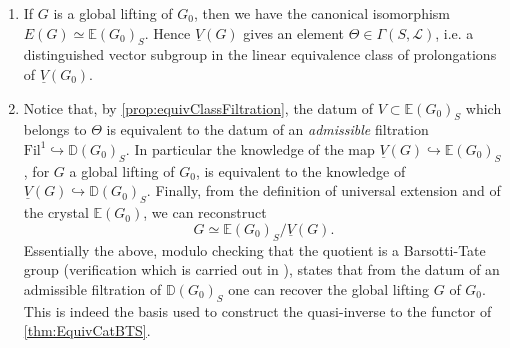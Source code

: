 \begin{rem}[]
\begin{enumerate}
	\item If $G$ is a global lifting of $G_0$, then we have the canonical isomorphism
		$E(G) \simeq \mathbb{E}(G_0)_S$.
		Hence $\underline{V}(G)$ gives an element $\Theta \in \Gamma(S,\mathscr{L})$,
		i.e. a distinguished vector subgroup in the linear equivalence
		class of prolongations of $\underline{V}(G_0)$.

	\item Notice that, by \cref{prop:equivClassFiltration}, the datum of 
		$V \subset \mathbb{E}(G_0)_S$ which belongs to $\Theta$ is
		equivalent to the datum of an {\em admissible} filtration
		$\mathrm{Fil}^1 \hookrightarrow \mathbb{D}(G_0)_S$.
		In particular the knowledge of the map
		$\underline{V}(G) \hookrightarrow \mathbb{E}(G_0)_S$, for $G$ a global
		lifting of $G_0$, is equivalent to the knowledge of
		$\underline{V}(G) \hookrightarrow \mathbb{D}(G_0)_S$.
		Finally, from the definition of universal extension
		and of the crystal $\mathbb{E}(G_0)$, we can reconstruct 
		\begin{equation*}
			G \simeq \mathbb{E}(G_0)_S/\underline{V}(G)
		.\end{equation*}
		Essentially the above, modulo checking that the quotient is
		a Barsotti-Tate group (verification which is carried out in
		\cite[Chapter V, theorem 1.6]{Messing}), states that from 
		the datum of an admissible filtration of $\mathbb{D}(G_0)_S$
		one can recover the global lifting $G$ of $G_0$.
		This is indeed the basis used to construct the quasi-inverse
		to the functor of \cref{thm:EquivCatBTS}.
\end{enumerate}
\end{rem}
